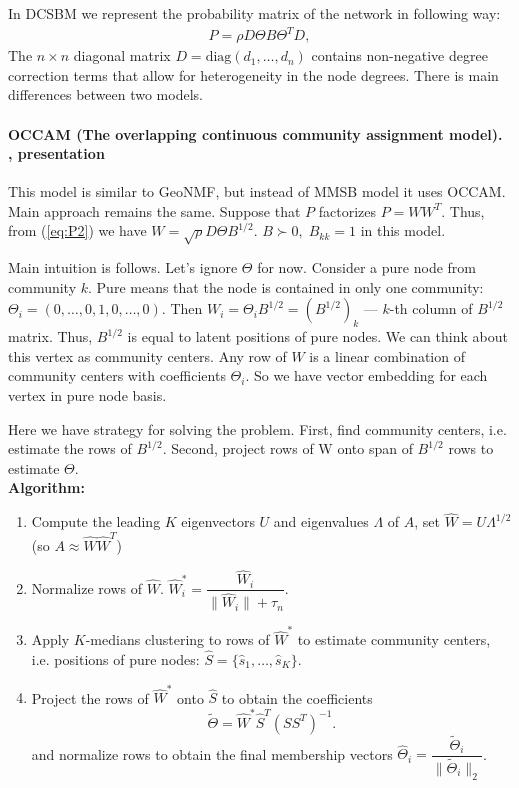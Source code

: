 \documentclass{ITaSconf}
\begin{document}
	In DCSBM we represent the probability matrix of the network in following way:
	\begin{align}
	\label{eq:P2}
	P = \rho D \Theta B \Theta^T D,
	\end{align}
	The $n \times n$ diagonal matrix $D = \mathrm{diag}(d_1, \dots, d_n)$ contains non-negative degree correction terms that allow for heterogeneity in the node degrees. There is main differences between two models.
	
	\paragraph{OCCAM (The overlapping continuous community assignment model). \cite{zhang2014OCCAM}, presentation \cite{Levina2014pres}}
	
	This model is similar to GeoNMF, but instead of MMSB model it uses OCCAM. Main approach remains the same.
	Suppose that $P$ factorizes $P=W W^T$. Thus, from (\ref{eq:P2}) we have $W = \sqrt \rho D \Theta B^{1/2}$. $B \succ 0, \; B_{kk} = 1$ in this model.
	
	Main intuition is follows. Let's ignore $\Theta$ for now. Consider a pure node from community $k$. Pure means that the node is contained in only one community: $\Theta_i = (0, \dots, 0, 1,0,\dots,0)$. Then $W_i = \Theta_i B^{1/2} = (B^{1/2})_k$ --- $k$-th column of $B^{1/2}$ matrix. Thus, $B^{1/2}$ is equal to latent positions of pure nodes. We can think about this vertex as community centers. Any row of $W$ is a linear combination of community centers with coefficients $\Theta_i$. So we have vector embedding for each vertex in pure node basis. 
	
	Here we have strategy for solving the problem.
	First, find community centers, i.e. estimate the rows of $B^{1/2}$. Second, project rows of W onto span of $B^{1/2}$ rows to estimate $\Theta$.\\
	
	\textbf{Algorithm:}
	\begin{enumerate}
		\item Compute the leading $K$ eigenvectors $U$ and eigenvalues $\Lambda$ of $A$, set $\hat W = U\Lambda^{1/2}$ (so $A \approx \hat{W}\hat{W}^T$)
		\item Normalize rows of $\hat W$. $\hat W^*_i = \dfrac{\hat W_i}{\|\hat W_i\| + \tau_n}$.
		\item Apply $K$-medians clustering to rows of $\hat W^*$ to estimate community centers, i.e. positions of pure nodes: $\hat S = \{\hat s_1,\dots,\hat s_K \}$.
		\item Project the rows of $\hat W^*$ onto $\hat S$ to obtain the coefficients $$ \tilde \Theta = \hat W^* \hat S ^T (S S^T)^{-1}. $$ and normalize rows to obtain the final membership vectors $\hat \Theta_i = \dfrac{\tilde \Theta_i}{\|\tilde\Theta_i\|_2}$.
	\end{enumerate}
	
\end{document}
